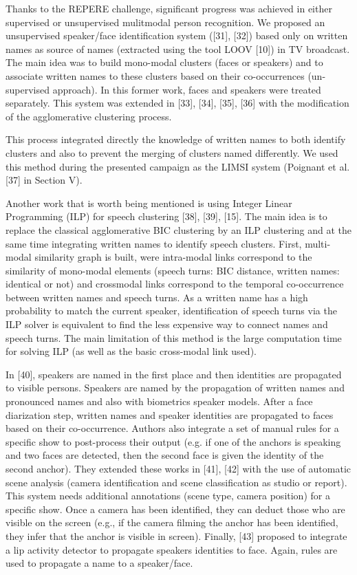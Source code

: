 Thanks to the REPERE challenge, significant progress was achieved in either supervised or unsupervised mulitmodal
person recognition. We proposed an unsupervised speaker/face identification system ([31], [32]) based only on written names
as source of names (extracted using the tool LOOV [10]) in TV broadcast. The main idea was to build mono-modal
clusters (faces or speakers) and to associate written names to these clusters based on their co-occurrences (un-supervised
approach). In this former work, faces and speakers were treated separately. This system was extended in [33], [34], [35], [36]
with the modification of the agglomerative clustering process.

This process integrated directly the knowledge of written names to both identify clusters and also to prevent the merging
of clusters named differently. We used this method during the presented campaign as the LIMSI system (Poignant et al. [37]
in Section V).

Another work that is worth being mentioned is using Integer Linear Programming (ILP) for speech clustering [38], [39],
[15]. The main idea is to replace the classical agglomerative BIC clustering by an ILP clustering and at the same time
integrating written names to identify speech clusters. First, multi-modal similarity graph is built, were intra-modal links
correspond to the similarity of mono-modal elements (speech turns: BIC distance, written names: identical or not) and crossmodal links correspond to the temporal co-occurrence between written names and speech turns. As a written name has a
high probability to match the current speaker, identification of speech turns via the ILP solver is equivalent to find the
less expensive way to connect names and speech turns. The main limitation of this method is the large computation time
for solving ILP (as well as the basic cross-modal link used).

In [40], speakers are named in the first place and then identities are propagated to visible persons. Speakers are named by
the propagation of written names and pronounced names and also with biometrics speaker models. After a face diarization
step, written names and speaker identities are propagated to faces based on their co-occurrence. Authors also integrate a
set of manual rules for a specific show to post-process their output (e.g. if one of the anchors is speaking and two faces
are detected, then the second face is given the identity of the second anchor). They extended these works in [41], [42] with
the use of automatic scene analysis (camera identification and scene classification as studio or report). This system needs
additional annotations (scene type, camera position) for a specific show. Once a camera has been identified, they can
deduct those who are visible on the screen (e.g., if the camera filming the anchor has been identified, they infer that the
anchor is visible in screen). Finally, [43] proposed to integrate a lip activity detector to propagate speakers identities to face.
Again, rules are used to propagate a name to a speaker/face. 

